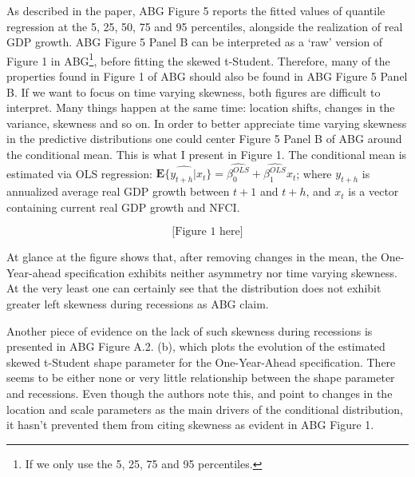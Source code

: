 \documentclass[
  11pt,
]{article}
\begin{document}
As described in the paper, ABG Figure 5 reports the fitted values of
quantile regression at the 5, 25, 50, 75 and 95 percentiles, alongside
the realization of real GDP growth. ABG Figure 5 Panel B can be
interpreted as a `raw' version of Figure 1 in
ABG\footnote{If we only use the 5, 25, 75 and 95 percentiles.}, before
fitting the skewed t-Student. Therefore, many of the properties found in
Figure 1 of ABG should also be found in ABG Figure 5 Panel B. If we want
to focus on time varying skewness, both figures are difficult to
interpret. Many things happen at the same time: location shifts, changes
in the variance, skewness and so on. In order to better appreciate time
varying skewness in the predictive distributions one could center Figure
5 Panel B of ABG around the conditional mean. This is what I present in
Figure 1. The conditional mean is estimated via OLS regression:
\(\widehat{\mathbf{E}\{y_{t+h} | x_t \}} = \widehat{\beta_0^{OLS}} + \widehat{\beta_1^{OLS}}x_t\);
where \(y_{t+h}\) is annualized average real GDP growth between \(t+1\)
and \(t+h\), and \(x_t\) is a vector containing current real GDP growth
and NFCI.

\[
\text{[Figure 1 here]}
\]

At glance at the figure shows that, after removing changes in the mean,
the One-Year-ahead specification exhibits neither asymmetry nor time
varying skewness. At the very least one can certainly see that the
distribution does not exhibit greater left skewness during recessions as
ABG claim.

Another piece of evidence on the lack of such skewness during recessions
is presented in ABG Figure A.2. (b), which plots the evolution of the
estimated skewed t-Student shape parameter for the One-Year-Ahead
specification. There seems to be either none or very little relationship
between the shape parameter and recessions. Even though the authors note
this, and point to changes in the location and scale parameters as the
main drivers of the conditional distribution, it hasn't prevented them
from citing skewness as evident in ABG Figure 1.
\end{document}
